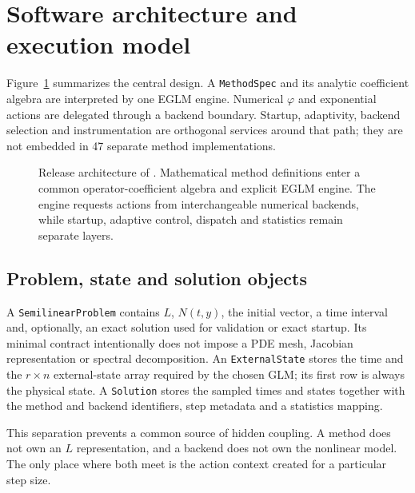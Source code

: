 \section{Software architecture and execution model}\label{sec:architecture}

Figure~\ref{fig:architecture} summarizes the central design.  A
\texttt{MethodSpec} and its analytic coefficient algebra are interpreted by one
EGLM engine.  Numerical $\varphi$ and exponential actions are delegated through
a backend boundary.  Startup, adaptivity, backend selection and instrumentation
are orthogonal services around that path; they are not embedded in 47 separate
method implementations.

\begin{figure}[t]
  \centering
  \resizebox{\linewidth}{!}{}
  \caption{Release architecture of \pkg{}.  Mathematical method definitions
  enter a common operator-coefficient algebra and explicit EGLM engine.  The
  engine requests actions from interchangeable numerical backends, while
  startup, adaptive control, dispatch and statistics remain separate layers.}
  \label{fig:architecture}
\end{figure}

\subsection{Problem, state and solution objects}

A \texttt{SemilinearProblem} contains $L$, $N(t,y)$, the initial vector, a time
interval and, optionally, an exact solution used for validation or exact
startup.  Its minimal contract intentionally does not impose a PDE mesh,
Jacobian representation or spectral decomposition.  An \texttt{ExternalState}
stores the time and the $r\times n$ external-state array required by the chosen
GLM; its first row is always the physical state.  A \texttt{Solution} stores the
sampled times and states together with the method and backend identifiers,
step metadata and a statistics mapping.

This separation prevents a common source of hidden coupling.  A method does
not own an $L$ representation, and a backend does not own the nonlinear model.
The only place where both meet is the action context created for a particular
step size.

